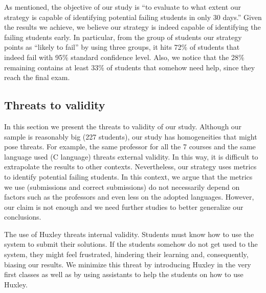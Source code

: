 As mentioned, the objective of our study is ``to evaluate to what extent our strategy is capable of identifying potential failing students in only 30 days.'' Given the results we achieve, we believe our strategy is indeed capable of identifying the failing students early. In particular, from the group of students our strategy points as ``likely to fail'' by using three groups, it hits 72\% of students that indeed fail with 95\% standard confidence level. Also, we notice that the 28\% remaining contains at least 33\% of students that somehow need help, since they reach the final exam.

\subsection{Threats to validity}

In this section we present the threats to validity of our study. Although our sample is reasonably big (227 students), our study has homogeneities that might pose threats. For example, the same professor for all the 7 courses and the same language used (C language) threats external validity. In this way, it is difficult to extrapolate the results to other contexts. Nevertheless, our strategy uses metrics to identify potential failing students. In this context, we argue that the metrics we use (submissions and correct submissions) do not necessarily depend on factors such as the professors and even less on the adopted languages. However, our claim is not enough and we need further studies to better generalize our conclusions.

The use of Huxley threats internal validity. Students must know how to use the system to submit their solutions. If the students somehow do not get used to the system, they might feel frustrated, hindering their learning and, consequently, biasing our results. We minimize this threat by introducing Huxley in the very first classes as well as by using assistants to help the students on how to use Huxley.